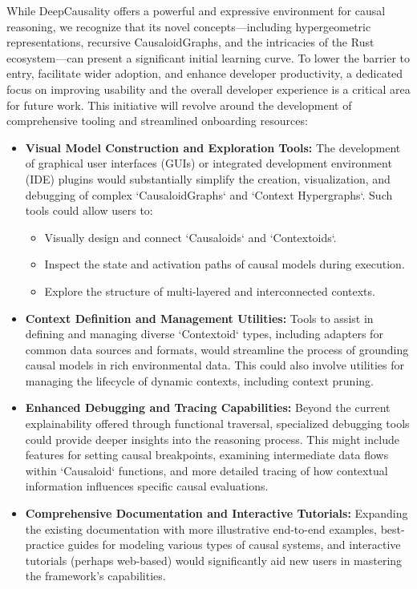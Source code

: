 While DeepCausality offers a powerful and expressive environment for causal reasoning, we recognize that its novel concepts—including hypergeometric representations, recursive CausaloidGraphs, and the intricacies of the Rust ecosystem—can present a significant initial learning curve. To lower the barrier to entry, facilitate wider adoption, and enhance developer productivity, a dedicated focus on improving usability and the overall developer experience is a critical area for future work. This initiative will revolve around the development of comprehensive tooling and streamlined onboarding resources:

\begin{itemize}
    \item \textbf{Visual Model Construction and Exploration Tools:} The development of graphical user interfaces (GUIs) or integrated development environment (IDE) plugins would substantially simplify the creation, visualization, and debugging of complex `CausaloidGraphs` and `Context Hypergraphs`. Such tools could allow users to:
    \begin{itemize}
        \item Visually design and connect `Causaloids` and `Contextoids`.
        \item Inspect the state and activation paths of causal models during execution.
        \item Explore the structure of multi-layered and interconnected contexts.
    \end{itemize}

    \item \textbf{Context Definition and Management Utilities:} Tools to assist in defining and managing diverse `Contextoid` types, including adapters for common data sources and formats, would streamline the process of grounding causal models in rich environmental data. This could also involve utilities for managing the lifecycle of dynamic contexts, including context pruning.

    \item \textbf{Enhanced Debugging and Tracing Capabilities:} Beyond the current explainability offered through functional traversal, specialized debugging tools could provide deeper insights into the reasoning process. This might include features for setting causal breakpoints, examining intermediate data flows within `Causaloid` functions, and more detailed tracing of how contextual information influences specific causal evaluations.

    \item \textbf{Comprehensive Documentation and Interactive Tutorials:} Expanding the existing documentation with more illustrative end-to-end examples, best-practice guides for modeling various types of causal systems, and interactive tutorials (perhaps web-based) would significantly aid new users in mastering the framework's capabilities.


\end{itemize}
